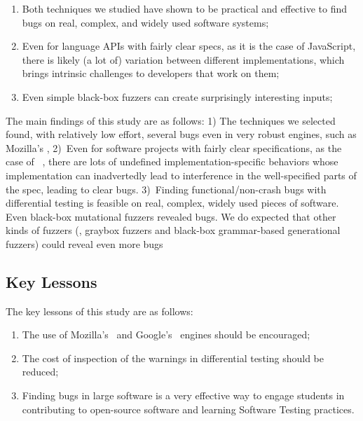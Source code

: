 \documentclass[smallextended]{svjour3}
\begin{document}
\begin{enumerate}
  \item Both techniques we studied have shown to be practical and
    effective to find bugs on real, complex, and widely used software
    systems;
  \item Even for language APIs with fairly clear specs, as it is the
    case of JavaScript, there is likely (a lot of) variation between
    different implementations, which brings intrinsic challenges to
    developers that work on them;
  \item Even simple black-box fuzzers can create surprisingly
    interesting inputs;

\end{enumerate}


The main findings of this study are as follows: 1) The techniques we
selected found, with relatively low effort, several bugs even in very
robust engines, such as Mozilla's \smonkey, 2)~Even for software
projects with fairly clear specifications, as the case of
\javascript{}~\cite{ecmas262-spec}, there are lots of undefined
implementation-specific behaviors whose implementation can
inadvertedly lead to interference in the well-specified parts of the
spec, leading to clear bugs. 3)~Finding functional/non-crash bugs with
differential testing is feasible on real, complex, widely used pieces
of software. Even black-box mutational fuzzers revealed bugs. We do
expected that other kinds of fuzzers (\eg{}, graybox fuzzers and
black-box grammar-based generational fuzzers) could reveal even more
bugs

\subsection{Key Lessons}
\label{sec:lessons}

The key lessons of this study are as follows:

\begin{enumerate}
\item The use of Mozilla's \smonkey\ and Google's \veight\ engines
  should be encouraged;
\item The cost of inspection of the warnings in differential testing
  should be reduced;
\item Finding bugs in large software is a very effective way to engage
  students in contributing to open-source software and learning
  Software Testing practices.
\end{enumerate}
\end{document}
